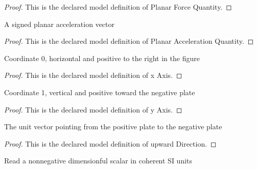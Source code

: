 \begin{proof}
  This is the declared model definition of Planar Force Quantity.
\end{proof}
\begin{definition}
  \label{def:physics:phyx-mini-0837:phyxminiproblems-problemphyxmini0837-planaraccelerationquantity}
  A signed planar acceleration vector
\end{definition}
\begin{proof}
  This is the declared model definition of Planar Acceleration Quantity.
\end{proof}
\begin{definition}[x Axis]
  \label{def:physics:phyx-mini-0837:phyxminiproblems-problemphyxmini0837-xaxis}
  Coordinate 0, horizontal and positive to the right in the figure
\end{definition}
\begin{proof}
  This is the declared model definition of x Axis.
\end{proof}
\begin{definition}[y Axis]
  \label{def:physics:phyx-mini-0837:phyxminiproblems-problemphyxmini0837-yaxis}
  Coordinate 1, vertical and positive toward the negative plate
\end{definition}
\begin{proof}
  This is the declared model definition of y Axis.
\end{proof}
\begin{definition}
  \label{def:physics:phyx-mini-0837:phyxminiproblems-problemphyxmini0837-upwarddirection}
  The unit vector pointing from the positive plate to the negative plate
\end{definition}
\begin{proof}
  This is the declared model definition of upward Direction.
\end{proof}
\begin{definition}
  \label{def:physics:phyx-mini-0837:phyxminiproblems-problemphyxmini0837-nonnegativesireadout}
  Read a nonnegative dimensionful scalar in coherent SI units
\end{definition}
